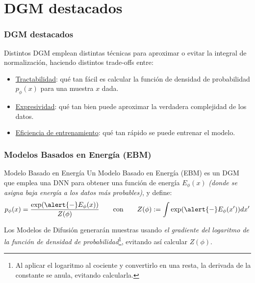 \documentclass{beamer}
\begin{document}
\section{DGM destacados}

\begin{frame}
	\frametitle{DGM destacados}
	Distintos DGM emplean distintas técnicas para aproximar o evitar la integral de normalización, haciendo distintos trade-offs entre:\pause
	\begin{itemize}
		\item \underline{Tractabilidad}: qué tan fácil es calcular la función de densidad de probabilidad $p_{\phi}(x)$ para una muestra $x$ dada.\pause
		\item \underline{Expresividad}: qué tan bien puede aproximar la verdadera complejidad de los datos.\pause
		\item \underline{Eficiencia de entrenamiento}: qué tan rápido se puede entrenar el modelo.
	\end{itemize}
\end{frame}


\begin{frame}
	\frametitle{Modelos Basados en Energía (EBM)}
	\begin{definitionblock}{Modelo Basado en Energía}
		Un Modelo Basado en Energía (EBM) es un DGM que emplea una DNN para obtener una función de energía $E_{\phi}(x)$ \emph{(donde se asigna baja energía a los datos más probables)}, y define:
		\begin{equation*}
			p_{\phi}(x) = \frac{\exp(\alert{-}E_{\phi}(x))}{Z({\phi})}
			\qquad \text{con} \qquad Z({\phi}) := \int \exp(\alert{-}E_{\phi}(x')) dx'
		\end{equation*}
	\end{definitionblock}\vspace{0.5cm}
	
	\pause

	Los Modelos de Difusión generarán muestras usando \emph{el gradiente del logaritmo de la función de densidad de probabilidad}\footnote{Al aplicar el logaritmo al cociente y convertirlo en una resta, la derivada de la constante se anula, evitando calcularla.}, evitando así calcular $Z({\phi})$.

\end{frame}
\end{document}
